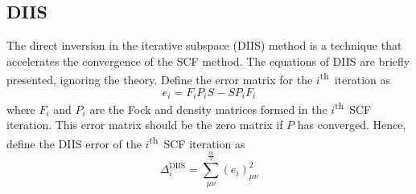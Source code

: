 \documentclass[final,3p,times,twocolumn]{elsarticle}
\newcommand{\ssth}{\textsuperscript{th}}
\begin{document}
\subsection{DIIS} \label{sec:diis}
The direct inversion in the iterative subspace (DIIS) method is a technique that accelerates the convergence of the SCF method.\cite{diis} The equations of DIIS are briefly presented, ignoring the theory. Define the error matrix for the $i$\ssth\ iteration as
\begin{equation} \label{eq:diiserror}
e_i = F_iP_iS - SP_iF_i
\end{equation}
where $F_i$ and $P_i$ are the Fock and density matrices formed in the $i$\ssth\ SCF iteration. This error matrix should be the zero matrix if $P$ has converged. 
Hence, define the DIIS error of the $i$\ssth\ SCF iteration as
\begin{equation} \label{eq:diiserrorterm}
\Delta_i^{\text{DIIS}} = \sum_{\mu\nu}^\frac{m}{2} (e_i)_{\mu\nu}^2
\end{equation}
\end{document}
